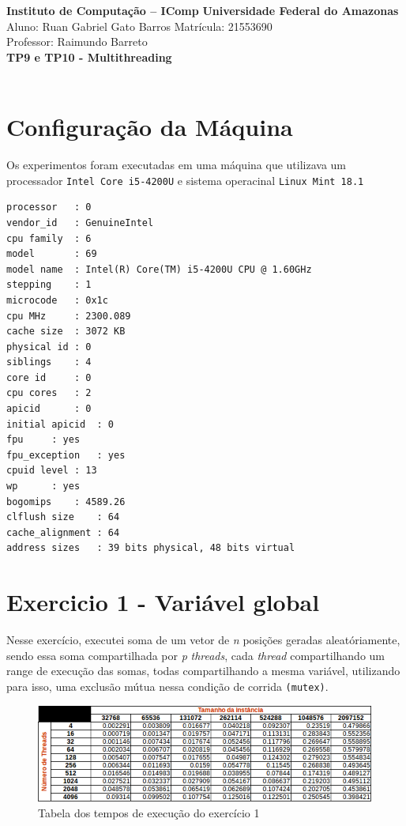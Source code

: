 \documentclass[a4paper, fontsize=12pt, parskip=half]{scrartcl}
\theoremstyle{mytheor}
\newcommand{\mytitle}[1]{{\noindent\Large\textbf{#1}}}
\begin{document}
\noindent\textbf{Instituto de Computação -- IComp} \hfill \textbf{Universidade Federal do Amazonas}\\
Aluno: Ruan Gabriel Gato Barros \hfill Matrícula: 21553690\\
Professor: Raimundo Barreto \hfill \\

\mytitle{TP9 e TP10 - Multithreading}\\\\

\section{Configuração da Máquina}

Os experimentos foram executadas em uma máquina que utilizava um processador \texttt{Intel Core i5-4200U} e sistema operacinal \texttt{Linux Mint 18.1}

\begin{lstlisting}
processor	: 0
vendor_id	: GenuineIntel
cpu family	: 6
model		: 69
model name	: Intel(R) Core(TM) i5-4200U CPU @ 1.60GHz
stepping	: 1
microcode	: 0x1c
cpu MHz		: 2300.089
cache size	: 3072 KB
physical id	: 0
siblings	: 4
core id		: 0
cpu cores	: 2
apicid		: 0
initial apicid	: 0
fpu		: yes
fpu_exception	: yes
cpuid level	: 13
wp		: yes
bogomips	: 4589.26
clflush size	: 64
cache_alignment	: 64
address sizes	: 39 bits physical, 48 bits virtual
\end{lstlisting}

\section{Exercicio 1 - Variável global}
Nesse exercício, executei soma de um vetor de \textit{n} posições geradas aleatóriamente, sendo essa soma compartilhada por \textit{p} \textit{threads}, cada \textit{thread} compartilhando um range de execução das somas, todas compartilhando a mesma variável, utilizando para isso, uma exclusão mútua nessa condição de corrida \texttt{(mutex)}.

\begin{figure}[htb!]
	\centering
	\includegraphics[width=1\linewidth]{gfx/1aQ}
	\caption{Tabela dos tempos de execução do exercício 1}
	\label{fig:1aq}
\end{figure}
\end{document}
